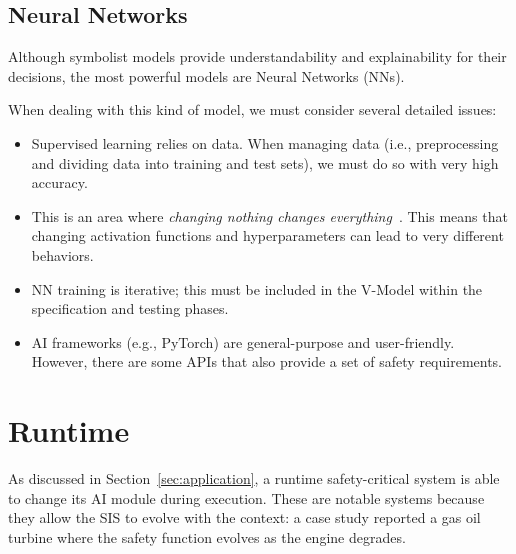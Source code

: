 \subsection{Neural Networks}
Although symbolist models provide understandability and explainability for their decisions, the most powerful models are Neural Networks (NNs).

When dealing with this kind of model, we must consider several detailed issues:
\begin{itemize}
    \item Supervised learning relies on data. When managing data (i.e., preprocessing and dividing data into training and test sets), we must do so with very high accuracy.
    \item This is an area where \textit{changing nothing changes everything}~\cite{perez2024artificial}. This means that changing activation functions and hyperparameters can lead to very different behaviors.
    \item NN training is iterative; this must be included in the V-Model within the specification and testing phases.
    \item AI frameworks (e.g., PyTorch) are general-purpose and user-friendly. However, there are some APIs that also provide a set of safety requirements.
\end{itemize}

\section{Runtime}
As discussed in Section~\ref{sec:application}, a runtime safety-critical system is able to change its AI module during execution. These are notable systems because they allow the SIS to evolve with the context: a case study reported a gas oil turbine where the safety function evolves as the engine degrades.

